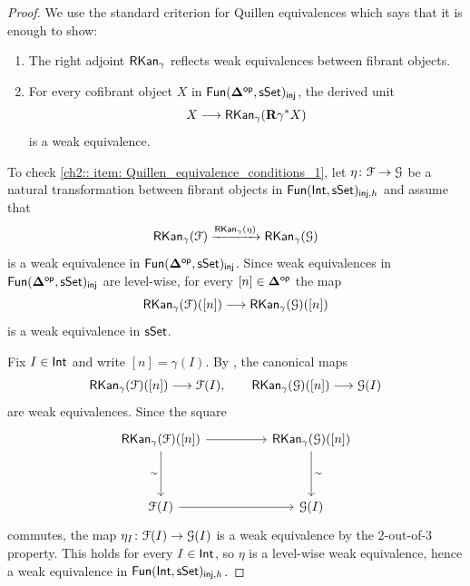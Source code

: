 \begin{proof}
    We use the standard criterion for Quillen equivalences which says that it is enough to show:
    \begin{enumerate}
        \item \label{ch2:: item: Quillen_equivalence_conditions_1} The right adjoint $\operatorname{{\sf RKan}}_\gamma$ reflects weak equivalences between fibrant objects.
        \item \label{ch2:: item: Quillen_equivalence_conditions_2} For every cofibrant object $X$ in $\operatorname{\sf Fun}(\mathbf\Delta^{\mathsf{op}},\operatorname{\sf sSet})_{\mathsf{inj}}$, the derived unit 
        \begin{equation}
            X \longrightarrow \operatorname{{\sf RKan}}_{\gamma}(\mathbf R \gamma^{*}X)
        \end{equation}
        is a weak equivalence.
    \end{enumerate} 

    To check \eqref{ch2:: item: Quillen_equivalence_conditions_1}, let $\eta\colon \mathcal F \to \mathcal G$ be a natural transformation between fibrant objects in $\operatorname{\sf Fun}(\operatorname{\mathsf{Int}},\operatorname{\sf sSet})_{\mathsf{inj}, h}$ and assume that
    \begin{equation}
        \operatorname{{\sf RKan}}_\gamma(\mathcal F) \xrightarrow{\operatorname{{\sf RKan}}_\gamma (\eta)} \operatorname{{\sf RKan}}_\gamma(\mathcal G)
    \end{equation}
    is a weak equivalence in $\operatorname{\sf Fun}(\mathbf\Delta^{\mathsf{op}},\operatorname{\sf sSet})_{\mathsf{inj}}$. Since weak equivalences in $\operatorname{\sf Fun}(\mathbf\Delta^{\mathsf{op}}, \operatorname{\sf sSet})_{\mathsf{inj}}$ are level-wise, for every $[n]\in \mathbf\Delta^{\mathsf{op}}$ the map
    \begin{equation}
        \operatorname{{\sf RKan}}_\gamma(\mathcal F)([n]) \longrightarrow \operatorname{{\sf RKan}}_\gamma(\mathcal G)([n])
    \end{equation}
    is a weak equivalence in $\operatorname{\sf sSet}$.

    Fix $I\in \operatorname{\mathsf{Int}}$ and write $[n]=\gamma(I)$. By , the canonical maps
    \[
      \operatorname{{\sf RKan}}_\gamma(\mathcal F)([n]) \longrightarrow \mathcal F(I),
      \qquad
      \operatorname{{\sf RKan}}_\gamma(\mathcal G)([n]) \longrightarrow \mathcal G(I)
    \]
    are weak equivalences. Since the square
    \[
        \begin{tikzcd}[ampersand replacement=\&]
            {\rkan_\gamma(\cF)([n])} \&\& {\rkan_\gamma(\cG)([n])} \\
            \\
            {\cF(I)} \&\& {\cG(I)}
            \arrow[from=1-1, to=1-3]
            \arrow["\sim"', from=1-1, to=3-1]
            \arrow["\sim", from=1-3, to=3-3]
            \arrow[from=3-1, to=3-3]
        \end{tikzcd}
    \]
    commutes, the map $\eta_I\colon \mathcal F(I)\to\mathcal G(I)$ is a weak equivalence by the $2$-out-of-$3$ property. This holds for every $I\in\operatorname{\mathsf{Int}}$, so $\eta$ is a level-wise weak equivalence, hence a weak equivalence in $\operatorname{\sf Fun}(\operatorname{\mathsf{Int}},\operatorname{\sf sSet})_{\mathsf{inj},h}$.


\end{proof}
